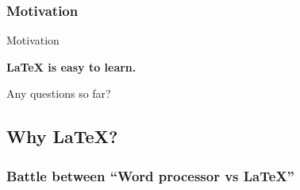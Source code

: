 \documentclass[11pt]{beamer}
\begin{document}
\subsubsection{Motivation}
\begin{frame}{Motivation}
\begin{tcolorbox}
\begin{center}

\bfseries \Large \LaTeX\hspace{0.01cm} is easy to learn.

\end{center}
\end{tcolorbox}
\end{frame}

\begin{frame}
\begin{center}
\Huge Any questions so far?
\end{center}
\end{frame}

\subsection{Why \LaTeX?}
\subsubsection{Battle between \textquotedblleft Word processor vs \LaTeX\textquotedblright}
\end{document}
